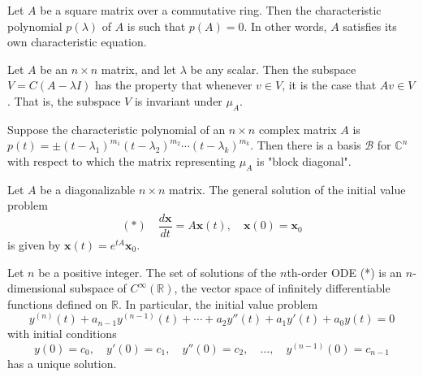 \documentclass[12pt]{article}
\begin{document}
\begin{theorem}
Let \( A \) be a square matrix over a commutative ring. Then the characteristic polynomial \( p(\lambda) \) of \( A \) is such that \( p(A) = 0 \). In other words, \( A \) satisfies its own characteristic equation.
\end{theorem}

\begin{theorem}[Invariance]
Let \( A \) be an \( n \times n \) matrix, and let \( \lambda \) be any scalar. Then the subspace \( V = C(A - \lambda I) \) has the property that whenever \( v \in V \), it is the case that \( Av \in V \). That is, the subspace \( V \) is invariant under \( \mu_A \).
\end{theorem}

\begin{theorem}
Suppose the characteristic polynomial of an \( n \times n \) complex matrix \( A \) is \( p(t) = \pm(t - \lambda_1)^{m_1}(t - \lambda_2)^{m_2} \cdots (t - \lambda_k)^{m_k} \). Then there is a basis \( \mathcal{B} \) for \( \mathbb{C}^n \) with respect to which the matrix representing \( \mu_A \) is "block diagonal".
\end{theorem}

\begin{theorem}
Let \( A \) be a diagonalizable \( n \times n \) matrix. The general solution of the initial value problem
\begin{equation*}
    (*) \quad \frac{d\mathbf{x}}{dt} = A\mathbf{x}(t), \quad \mathbf{x}(0) = \mathbf{x}_0
\end{equation*}
is given by \( \mathbf{x}(t) = e^{tA}\mathbf{x}_0 \).
\end{theorem}


\begin{theorem}
Let \( n \) be a positive integer. The set of solutions of the \( n \)th-order ODE (*) is an \( n \)-dimensional subspace of \( C^{\infty}(\mathbb{R}) \), the vector space of infinitely differentiable functions defined on \( \mathbb{R} \). In particular, the initial value problem
\begin{equation*}
    y^{(n)}(t) + a_{n-1}y^{(n-1)}(t) + \cdots + a_2y''(t) + a_1y'(t) + a_0y(t) = 0
\end{equation*}
with initial conditions
\begin{equation*}
    y(0) = c_0, \quad y'(0) = c_1, \quad y''(0) = c_2, \quad \ldots, \quad y^{(n-1)}(0) = c_{n-1}
\end{equation*}
has a unique solution.
\end{theorem}

 
\end{document}
